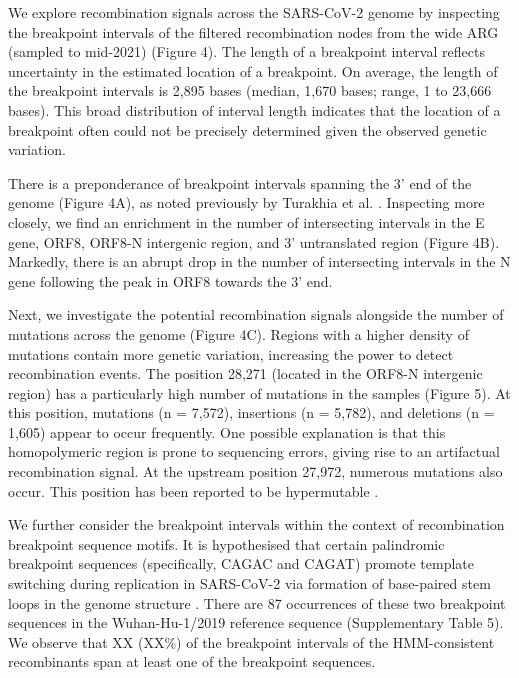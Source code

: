 \documentclass{article}
\begin{document}
We explore recombination signals across the SARS-CoV-2 genome by inspecting the
breakpoint intervals of the filtered recombination nodes from the wide ARG
(sampled to mid-2021) (Figure 4). The length of a breakpoint interval reflects
uncertainty in the estimated location of a breakpoint. On average, the length
of the breakpoint intervals is 2,895 bases (median, 1,670 bases; range, 1 to
23,666 bases). This broad distribution of interval length indicates that the
location of a breakpoint often could not be precisely determined given the
observed genetic variation.

There is a preponderance of breakpoint intervals spanning the 3’ end of the
genome (Figure 4A), as noted previously by Turakhia et al.
\cite{Turakhia2022-it}. Inspecting more closely, we find an enrichment in the
number of intersecting intervals in the E gene, ORF8, ORF8-N intergenic region,
and 3’ untranslated region (Figure 4B). Markedly, there is an abrupt drop in
the number of intersecting intervals in the N gene following the peak in ORF8
towards the 3’ end.

Next, we investigate the potential recombination signals alongside the number
of mutations across the genome (Figure 4C). Regions with a higher density of
mutations contain more genetic variation, increasing the power to detect
recombination events. The position 28,271 (located in the ORF8-N intergenic
region) has a particularly high number of mutations in the samples (Figure 5).
At this position, mutations (n = 7,572), insertions (n = 5,782), and deletions
(n = 1,605) appear to occur frequently. One possible explanation is that this
homopolymeric region is prone to sequencing errors, giving rise to an
artifactual recombination signal. At the upstream position 27,972, numerous
mutations also occur. This position has been reported to be hypermutable
\cite{Jungreis2021-dh}.

We further consider the breakpoint intervals within the context of
recombination breakpoint sequence motifs. It is hypothesised that certain
palindromic breakpoint sequences (specifically, CAGAC and CAGAT) promote
template switching during replication in SARS-CoV-2 via formation of
base-paired stem loops in the genome structure \cite{Gallaher2020-lb}. There
are 87 occurrences of these two breakpoint sequences in the Wuhan-Hu-1/2019
reference sequence (Supplementary Table 5). We observe that XX (XX\%) of the
breakpoint intervals of the HMM-consistent recombinants span at least one of
the breakpoint sequences.
\end{document}
